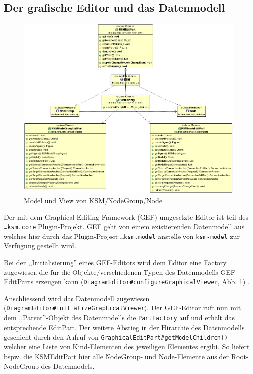\documentclass[%
12pt,titlepage,abstracton,DIV=10,BCOR=0.5cm]{scrreprt}
\begin{document}
\subsection{Der grafische Editor und das Datenmodell}
\begin{figure}[ht]
\centering
\includegraphics[width=\textwidth]{images/model.PNG}
\caption{Model und View von KSM/NodeGroup/Node}
\label{fig:model}
\end{figure}

Der mit dem Graphical Editing Framework (GEF) umgesetzte Editor ist teil des
\texttt{\ldots ksm.\-core} Plugin-Projekt. GEF geht von einem existierenden
Datenmodell aus welches hier durch das Plugin-Project \texttt{\ldots ksm.model}
anstelle von \texttt{ksm-model} zur Verfügung gestellt wird.

Bei der ,,Initialisierung'' eines GEF-Editors wird dem Editor eine Factory
zugewiesen die für die Objekte/verschiedenen Typen des Datenmodells
GEF-EditParts erzeugen kann
(\texttt{Diagram\-Editor\-\#configureGraphicalViewer}, Abb. \ref{fig:model})
\cite{gef1}.

Anschliessend wird das Datenmodell zugewiesen
(\texttt{DiagramEditor\-\#initialize\-Graph\-ical\-Viewer}). Der GEF-Editor ruft
nun mit dem ,,Parent''-Objekt des Datenmodells die \texttt{Part\-Factory} auf
und erhält das entsprechende EditPart. Der weitere Abstieg in der Hirarchie des
Datenmodells geschieht durch den Aufruf von
\texttt{Graphical\-Edit\-Part\-\#getModel\-Children()} welcher eine Liste von
Kind-Elementen des jeweiligen Elementes ergibt. So liefert bspw. die KSMEditPart
hier alle NodeGroup- und Node-Elemente aus der Root-NodeGroup des Datenmodels.
\end{document}
